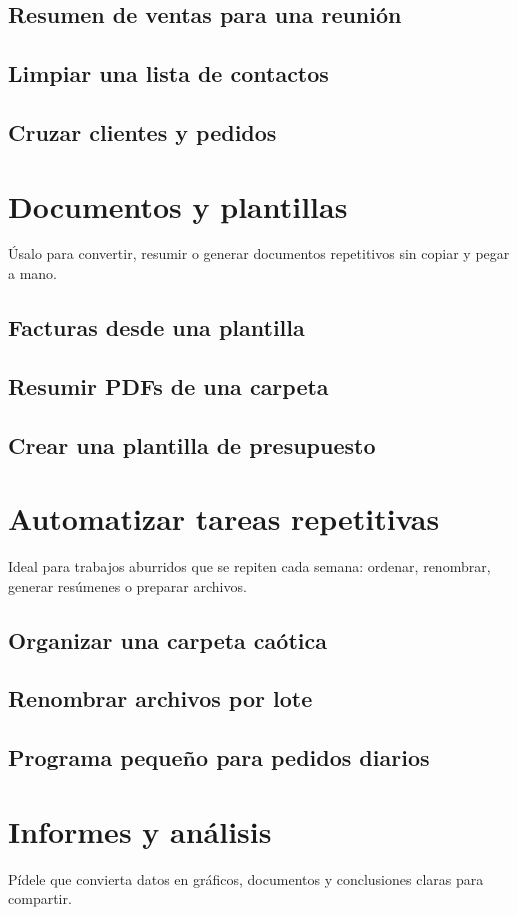 \documentclass[11pt,a4paper]{book}
\begin{document}
\subsection{Resumen de ventas para una reunión}
\subsection{Limpiar una lista de contactos}
\subsection{Cruzar clientes y pedidos}
\section{Documentos y plantillas}
Úsalo para convertir, resumir o generar documentos repetitivos sin copiar y pegar a mano.

\subsection{Facturas desde una plantilla}
\subsection{Resumir PDFs de una carpeta}
\subsection{Crear una plantilla de presupuesto}
\section{Automatizar tareas repetitivas}
Ideal para trabajos aburridos que se repiten cada semana: ordenar, renombrar, generar resúmenes o preparar archivos.

\subsection{Organizar una carpeta caótica}
\subsection{Renombrar archivos por lote}
\subsection{Programa pequeño para pedidos diarios}
\section{Informes y análisis}
Pídele que convierta datos en gráficos, documentos y conclusiones claras para compartir.
\end{document}
